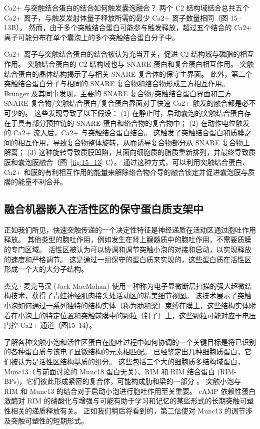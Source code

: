 Ca2+ 与突触结合蛋白的结合如何触发囊泡融合？
两个 C2 结构域结合总共五个 Ca2+ 离子，与触发发射体量子释放所需的最少 Ca2+ 离子数量相同（图 15–13B）。
然而，由于多个突触结合蛋白可能参与触发释放，超过五个结合的 Ca2+ 离子可能分布在单个囊泡上的多个突触结合蛋白分子中。


Ca2+ 离子与突触结合蛋白的结合被认为充当开关，促进 C2 结构域与磷脂的相互作用。
突触结合蛋白的 C2 结构域也与 SNARE 蛋白和复合蛋白相互作用。
突触结合蛋白的晶体结构揭示了与相关 SNARE 复合体的保守主界面。
此外，第二个突触结合蛋白分子与相同的 SNARE 复合物和络合物形成三方相互作用。
Brunger 及其同事发现，主要的 SNARE 复合物/突触结合蛋白界面和三方 SNARE 复合物/突触结合蛋白/复合蛋白界面对于快速 Ca2+ 触发的融合都是必不可少的。
这些发现导致了以下假设：
(1) 在静止时，启动囊泡的突触结合蛋白存在于具有部分预拉链的 SNARE 蛋白和络合物的复合物中；
(2) 在动作电位触发的 Ca2+ 流入后，Ca2+ 与突触结合蛋白结合。 这触发了突触结合蛋白和质膜之间的相互作用，导致复合物整体旋转，从而诱导复合物部分从 SNARE 复合物上解离；
(3) 这种旋转导致质膜凹陷，其面向细胞质的脂质重新排列，并最终导致质膜和囊泡膜融合（图~\ref{fig:15_13} C）。
通过这种方式，可以利用突触结合蛋白、Ca2+ 和膜的有利相互作用的能量来解除络合物介导的融合锁定并促进囊泡膜与质膜的能量不利合并。



\subsection{融合机器嵌入在活性区的保守蛋白质支架中}

正如我们所见，快速突触传递的一个决定性特征是神经递质在活动区通过胞吐作用释放。
其他类型的胞吐作用，例如发生在肾上腺髓质中的胞吐作用，不需要质膜的专门区域。
活性区被认为可以协调和调节突触小泡的对接和启动，以实现释放的速度和严格调节。
这是通过一组保守的蛋白质来实现的，这些蛋白质在活性区形成一个大的大分子结构。


杰克·麦克马汉 (Jack MacMahan) 使用一种称为电子显微断层扫描的强大超微结构技术，获得了青蛙神经肌肉接头处活动区的精美细节视图。
该技术展示了突触小泡如何通过一系列独特的结构实体（称为肋和梁）束缚在膜上，这些结构实体附着在小泡上的特定位置和突触前膜中的颗粒（钉子）上，这些颗粒可能对应于电压门控 Ca2+ 通道（图15–14）。


了解各种突触小泡和活性区蛋白在胞吐过程中如何协调的一个关键目标是将已识别的各种蛋白质与该电子显微结构的元素相匹配。
已经鉴定出几种细胞质蛋白，它们被认为是活性区结构基质的组分。
这些包括三个大的细胞质多结构域蛋白，Munc13（与前面讨论的 Munc18 蛋白无关）、RIM 和 RIM 结合蛋白 (RIM-BPs)，它们彼此形成紧密的复合体，可能构成肋和梁的一部分 。
突触小泡与 RIM 和 Munc13 的结合对于启动小泡进行胞吐作用至关重要。
cAMP 依赖性蛋白激酶对 RIM 的磷酸化与增强与可能有助于学习和记忆的某些形式的长期突触可塑性相关的递质释放有关。
正如我们稍后将看到的，第二信使对 Munc13 的调节涉及突触可塑性的短期形式。


